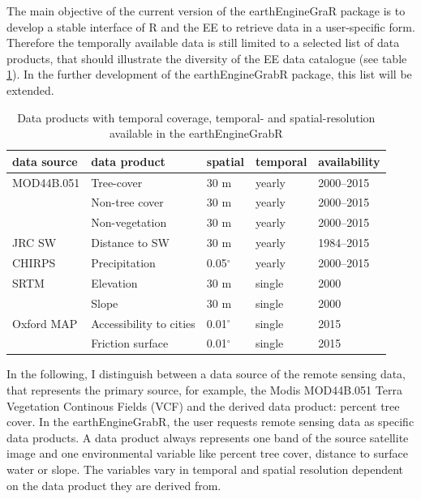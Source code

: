 The main objective of the current version of the earthEngineGraR package is to develop a stable interface of R and the EE to retrieve data in a user-specific form. Therefore the temporally available data is still limited to a selected list of data products, that should illustrate the diversity of the EE data catalogue (see table \ref{data}). In the further development of the earthEngineGrabR package, this list will be extended.

\begin{table}[h]
	\begin{tabularx}{\textwidth}{|l|l|X|X|X|}
		\hline
		\textbf{data source} & \textbf{data product} & \textbf{spatial} & \textbf{temporal} & \textbf{availability}\\
		\hline
		
		MOD44B.051 & Tree-cover  & 30 m & yearly & 2000–2015 \\
		
		& Non-tree cover  & 30 m & yearly & 2000–2015 \\
		
		& Non-vegetation  & 30 m & yearly & 2000–2015 \\
		
		JRC SW  & Distance to SW & 30 m & yearly & 1984–2015 \\
		
		CHIRPS & Precipitation & 0.05$^\circ$ & yearly & 2000–2015\\
		
		SRTM & Elevation  & 30 m & single & 2000\\
		& Slope  & 30 m & single & 2000\\
		
		Oxford MAP & Accessibility to cities  & 0.01$^\circ$ & single & 2015\\
		
		& Friction surface  & 0.01$^\circ$  & single & 2015\\
		
		\hline
	\end{tabularx}
	\caption{Data products with temporal coverage, temporal- and spatial-resolution available in the earthEngineGrabR}
	\label{data}
\end{table}

In the following, I distinguish between a data source of the remote sensing data, that represents the primary source, for example, the Modis MOD44B.051 Terra Vegetation Continous Fields (VCF) and the derived data product: percent tree cover. In the earthEngineGrabR, the user requests remote sensing data as specific data products. A data product always represents one band of the source satellite image and one environmental variable like percent tree cover, distance to surface water or slope.
The variables vary in temporal and spatial resolution dependent on the data product they are derived from. 

